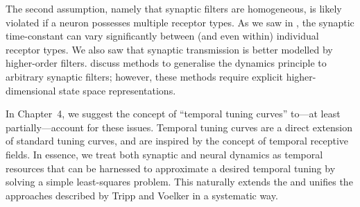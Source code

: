 The second assumption, namely that synaptic filters are homogeneous, is likely violated if a neuron possesses multiple receptor types.
As we saw in , the synaptic time-constant can vary significantly between (and even within) individual receptor types.
We also saw that synaptic transmission is better modelled by higher-order filters.
 discuss methods to generalise the dynamics principle to arbitrary synaptic filters; however, these methods require explicit higher-dimensional state space representations.

In Chapter~4, we suggest the concept of \enquote{temporal tuning curves} to---at least partially---account for these issues.
Temporal tuning curves are a direct extension of standard \NEF tuning curves, and are inspired by the concept of temporal receptive fields.
In essence, we treat both synaptic and neural dynamics as temporal resources that can be harnessed to approximate a desired temporal tuning by solving a simple least-squares problem.
This naturally extends the \NEF and unifies the approaches described by Tripp and Voelker in a systematic way.
